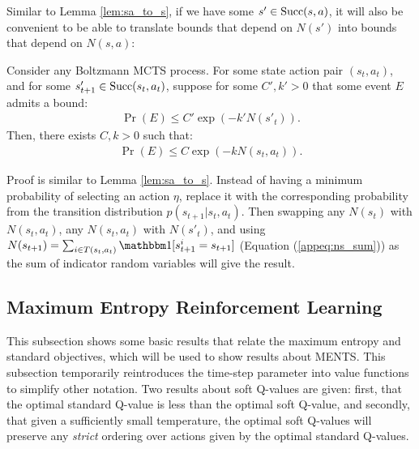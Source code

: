         Similar to Lemma \ref{lem:sa_to_s}, if we have some $s'\in{\textnormal{Succ}(s,a)}$, it will also be convenient to be able to translate bounds that depend on $N(s')$ into bounds that depend on $N(s,a)$:
        \begin{lemma} \label{lem:s_to_sa}
            Consider any Boltzmann MCTS process. For some state action pair $(s_t,a_t)$, and for some $s'_{t+1}\in{\textnormal{Succ}(s_t,a_t)}$, suppose for some $C',k'>0$ that some event $E$ admits a bound:
            \begin{align}
                \Pr(E) \leq C'\exp(-k'N(s'_t)).
            \end{align}
            Then, there exists $C,k>0$ such that:
            \begin{align}
                \Pr(E) \leq C\exp(-k N(s_t,a_t)).
            \end{align}
        \end{lemma}
        \begin{proofoutline}
            Proof is similar to Lemma \ref{lem:sa_to_s}. Instead of having a minimum probability of selecting an action $\eta$, replace it with the corresponding probability from the transition distribution $p(s_{t+1}|s_t,a_t)$. Then swapping any $N(s_t)$ with $N(s_t,a_t)$, any $N(s_t,a_t)$ with $N(s'_t)$, and using $N(s_{t+1}) = \sum_{i\in T(s_t,a_t)} \one[s^i_{t+1} = s_{t+1}]$ (Equation (\ref{appeq:ns_sum})) as the sum of indicator random variables will give the result.
        \end{proofoutline}














        \subsection{Maximum Entropy Reinforcement Learning} \label{app:soft_learning_results}
        


            This subsection shows some basic results that relate the maximum entropy and standard objectives, which will be used to show results about MENTS. This subsection temporarily reintroduces the time-step parameter into value functions to simplify other notation. Two results about soft Q-values are given: first, that the optimal standard Q-value is less than the optimal soft Q-value, and secondly, that given a sufficiently small temperature, the optimal soft Q-values will preserve any \textit{strict} ordering over actions given by the optimal standard Q-values. 







